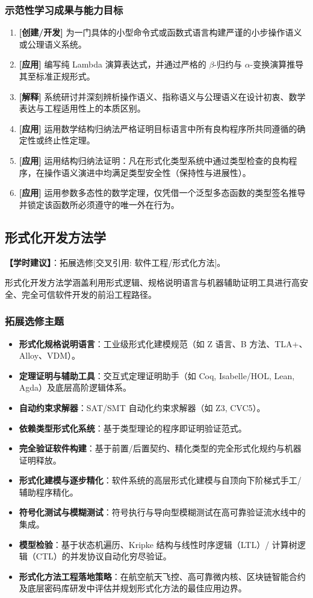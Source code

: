 \subsubsection{示范性学习成果与能力目标}
\begin{enumerate}
    \item \textbf{[创建/开发]} 为一门具体的小型命令式或函数式语言构建严谨的小步操作语义或公理语义系统。
    \item \textbf{[应用]} 编写纯 Lambda 演算表达式，并通过严格的 $\beta$-归约与 $\alpha$-变换演算推导其至标准正规形式。
    \item \textbf{[解释]} 系统研讨并深刻辨析操作语义、指称语义与公理语义在设计初衷、数学表达与工程适用性上的本质区别。
    \item \textbf{[应用]} 运用数学结构归纳法严格证明目标语言中所有良构程序所共同遵循的确定性或终止性定理。
    \item \textbf{[应用]} 运用结构归纳法证明：凡在形式化类型系统中通过类型检查的良构程序，在操作语义演进中均满足类型安全性（保持性与进展性）。
    \item \textbf{[应用]} 运用参数多态性的数学定理，仅凭借一个泛型多态函数的类型签名推导并锁定该函数所必须遵守的唯一外在行为。
\end{enumerate}

\subsection{形式化开发方法学}
\textbf{【学时建议】}：拓展选修[交叉引用: 软件工程/形式化方法]。

形式化开发方法学涵盖利用形式逻辑、规格说明语言与机器辅助证明工具进行高安全、完全可信软件开发的前沿工程路径。

\subsubsection{拓展选修主题}
\begin{itemize}
    \item \textbf{形式化规格说明语言}：工业级形式化建模规范（如 Z 语言、B 方法、TLA+、Alloy、VDM）。
    \item \textbf{定理证明与辅助工具}：交互式定理证明助手（如 Coq, Isabelle/HOL, Lean, Agda）及底层高阶逻辑体系。
    \item \textbf{自动约束求解器}：SAT/SMT 自动化约束求解器（如 Z3, CVC5）。
    \item \textbf{依赖类型形式化系统}：基于类型理论的程序即证明验证范式。
    \item \textbf{完全验证软件构建}：基于前置/后置契约、精化类型的完全形式化规约与机器证明释放。
    \item \textbf{形式化建模与逐步精化}：软件系统的高层形式化建模与自顶向下阶梯式手工/辅助程序精化。
    \item \textbf{符号化测试与模糊测试}：符号执行与导向型模糊测试在高可靠验证流水线中的集成。
    \item \textbf{模型检验}：基于状态机遍历、Kripke 结构与线性时序逻辑（LTL）/ 计算树逻辑（CTL）的并发协议自动化穷尽验证。
    \item \textbf{形式化方法工程落地策略}：在航空航天飞控、高可靠微内核、区块链智能合约及底层密码库研发中评估并规划形式化方法的最佳应用边界。
\end{itemize}

